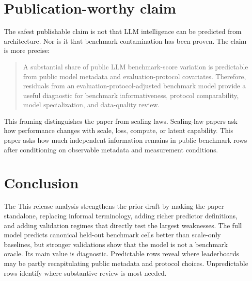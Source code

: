 \documentclass[11pt]{article}
\begin{document}
\section{Publication-worthy claim}
The safest publishable claim is not that LLM intelligence can be predicted from architecture.  Nor is it that benchmark contamination has been proven.  The claim is more precise:
\begin{quote}
A substantial share of public LLM benchmark-score variation is predictable from public model metadata and evaluation-protocol covariates.  Therefore, residuals from an evaluation-protocol-adjusted benchmark model provide a useful diagnostic for benchmark informativeness, protocol comparability, model specialization, and data-quality review.
\end{quote}

This framing distinguishes the paper from scaling laws.  Scaling-law papers ask how performance changes with scale, loss, compute, or latent capability.  This paper asks how much independent information remains in public benchmark rows after conditioning on observable metadata and measurement conditions.

\section{Conclusion}
The This release analysis strengthens the prior draft by making the paper standalone, replacing informal terminology, adding richer predictor definitions, and adding validation regimes that directly test the largest weaknesses.  The full model predicts canonical held-out benchmark cells better than scale-only baselines, but stronger validations show that the model is not a benchmark oracle.  Its main value is diagnostic.  Predictable rows reveal where leaderboards may be partly recapitulating public metadata and protocol choices.  Unpredictable rows identify where substantive review is most needed.

\appendix
\end{document}
